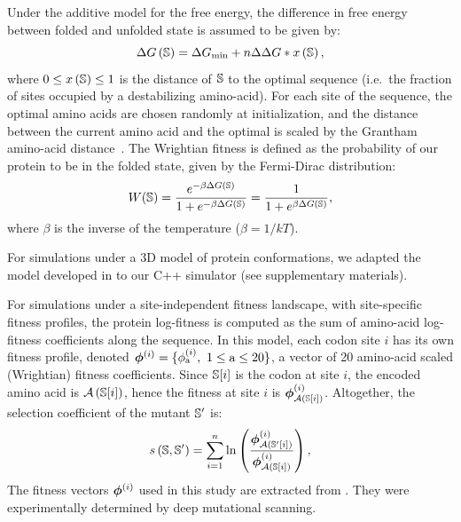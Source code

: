 \documentclass{article}
\begin{document}
Under the additive model for the free energy, the difference in free energy between folded and unfolded state is assumed to be given by:
\begin{equation*}
    \Delta G\left(\mathbb{S}\right) = \Delta G_{\text{min}} + n \Delta \Delta G * x\left(\mathbb{S}\right),
\end{equation*}
where $0 \leq x\left(\mathbb{S}\right) \leq 1$ is the distance of $\mathbb{S}$ to the optimal sequence (i.e.~the fraction of sites occupied by a destabilizing amino-acid).
For each site of the sequence, the optimal amino acids are chosen randomly at initialization, and the distance between the current amino acid and the optimal is scaled by the Grantham amino-acid distance~\citep{Grantham1974}.
The Wrightian fitness is defined as the probability of our protein to be in the folded state, given by the Fermi-Dirac distribution:
\begin{equation}
    W (\mathbb{S}) = \dfrac{e^{-\beta \Delta G\left(\mathbb{S}\right) }}{1 + e^{-\beta \Delta G\left(\mathbb{S}\right) }} = \dfrac{1}{1 + e^{\beta \Delta G\left(\mathbb{S}\right) }},
\end{equation}
where $\beta$ is the inverse of the temperature ($\beta=1/kT$).

For simulations under a 3D model of protein conformations, we adapted the model developed in \citet{Goldstein2017} to our C++ simulator (see  supplementary materials).

For simulations under a site-independent fitness landscape, with site-specific fitness profiles, the protein log-fitness is computed as the sum of amino-acid log-fitness coefficients along the sequence.
In this model, each {codon} site $i$ has its own fitness profile, denoted $\bm{\phi}^{(i)} = \{ \phi^{(i)}_{\text{a}},\ 1 \leq \text{a} \leq 20 \}$, a vector of 20 amino-acid scaled (Wrightian) fitness coefficients.
Since $\mathbb{S}[ i ]$ is the {codon} at site $i$, the encoded amino acid is $\mathcal{A} \left( \mathbb{S}[ i ] \right)$, hence the fitness at site $i$ is $\bm{\phi}^{(i)}_{\mathcal{A} \left( \mathbb{S}[ i ] \right)}$.
Altogether, the selection coefficient of the mutant $\mathbb{S}'$ is:
\begin{equation}
    s \left( \mathbb{S},\mathbb{S}'\right) = \sum\limits_{ i = 1 }^{n} \ln \left( \dfrac{\bm{\phi}^{(i)}_{\mathcal{A} \left( \mathbb{S}'[ i ] \right)}}{\bm{\phi}^{(i)}_{\mathcal{A} \left( \mathbb{S}[ i ] \right)}} \right),
\end{equation}
The fitness vectors $\bm{\phi}^{(i)}$ used in this study are extracted from \citet{Bloom2017}.
They were experimentally determined by deep mutational scanning.
\end{document}
